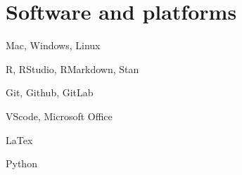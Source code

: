 \documentclass[letterpaper]{resume_config}
\begin{document}
\section{Software and platforms}
\begin{SkillsList}
	\item Mac, Windows, Linux 
	\item R, RStudio, RMarkdown, Stan 
	\item Git, Github, GitLab 
	\item VScode, Microsoft Office
	\item LaTex
	\item Python 
\end{SkillsList}
%
%
%
\end{document}
